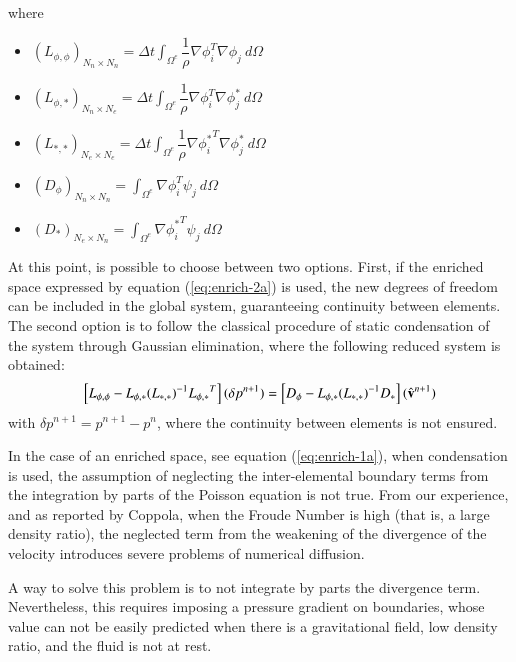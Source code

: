 where
\begin{itemize}
 \item ${(L_{\phi,\phi})}_{N_n\times N_n} = \Delta t \displaystyle \int_{\Omega^e} \dfrac{1}{\rho} \nabla \phi_i^T \nabla \phi_j \ d\Omega$
 \item ${(L_{\phi,*})}_{N_n\times N_e} = \Delta t \displaystyle \int_{\Omega^e} \dfrac{1}{\rho} \nabla \phi_i^T \nabla \phi_j^* \ d\Omega$
 \item ${(L_{*,*})}_{N_e\times N_e} = \Delta t \displaystyle \int_{\Omega^e} \dfrac{1}{\rho} \nabla {\phi_i^*}^T \nabla \phi_j^* \ d\Omega$
 \item ${(D_{\phi})}_{N_n\times N_n} = \displaystyle \int_{\Omega^e} \nabla \phi_i^T \psi_j \ d\Omega$
 \item ${(D_*)}_{N_e\times N_n} = \displaystyle \int_{\Omega^e}  \nabla {\phi_i^*}^T \psi_j \ d\Omega$
\end{itemize}

At this point, is possible to choose between two options. First, if the enriched space expressed by equation (\ref{eq:enrich-2a}) is used, the new degrees of freedom can be included in the global system, guaranteeing continuity between elements. The second option is to follow the classical procedure of static condensation of the system through Gaussian elimination\cite{Felippa04}, where the following reduced system is obtained:
  \begin{equation}
   \left[L_{\phi,\phi} - L_{\phi,*}{(L_{*,*})}^{-1}{L_{\phi,*}}^T\right](\delta p^{n+1}) = \left[D_{\phi}- L_{\phi,*}{(L_{*,*})}^{-1}D_{*}\right](\hat{\mathbf{v}}^{n+1})
   \label{condensing}
  \end{equation}
with $\delta p^{n+1} = p^{n+1}-p^{n}$, where the continuity between elements is not ensured.


In the case of an enriched space, see equation (\ref{eq:enrich-1a}), when condensation is used, the assumption of neglecting the inter-elemental boundary terms from the integration by parts of the Poisson equation is not true. From our experience, and as reported by Coppola\cite{Coppola05}, when the Froude Number is high (that is, a large density ratio), the neglected term from the weakening of the divergence of the velocity introduces severe problems of numerical diffusion.

A way to solve this problem is to not integrate by parts the divergence term. Nevertheless, this requires imposing a pressure gradient on boundaries, whose value can not be easily predicted when there is a gravitational field, low density ratio, and the fluid is not at rest.


